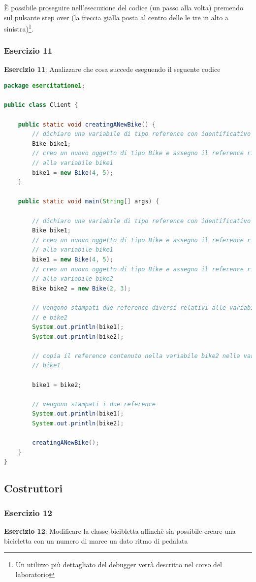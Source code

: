 \documentclass{article}
\theoremstyle{definition}
\begin{document}
\`E possibile proseguire nell'esecuzione del codice (un passo alla volta) premendo sul pulsante step over (la freccia gialla posta al centro delle le tre in alto a sinistra)\footnote{Un utilizzo pi\`u dettagliato del debugger verr\`a descritto nel corso del laboratorio}.

\subsubsection{Esercizio 11}
\begin{framed}
\textbf{Esercizio 11}: Analizzare che cosa succede eseguendo il seguente codice
\end{framed}
\begin{lstlisting}[language=Java,escapechar=|]
package esercitatione1;

public class Client {

	public static void creatingANewBike() {
		// dichiaro una variabile di tipo reference con identificativo bike1
		Bike bike1;
		// creo un nuovo oggetto di tipo Bike e assegno il reference ritornato
		// alla variabile bike1
		bike1 = new Bike(4, 5);
	}

	public static void main(String[] args) {

		// dichiaro una variabile di tipo reference con identificativo bike1
		Bike bike1;
		// creo un nuovo oggetto di tipo Bike e assegno il reference ritornato
		// alla variabile bike1
		bike1 = new Bike(4, 5);
		// creo un nuovo oggetto di tipo Bike e assegno il reference ritornato
		// alla variabile bike2
		Bike bike2 = new Bike(2, 3);

		// vengono stampati due reference diversi relativi alle variabili bike1
		// e bike2
		System.out.println(bike1);
		System.out.println(bike2);

		// copia il reference contenuto nella variabile bike2 nella variabile
		// bike1

		bike1 = bike2;

		// vengono stampati i due reference
		System.out.println(bike1);
		System.out.println(bike2);
		
		creatingANewBike();
    }
}
\end{lstlisting}


\subsection{Costruttori}
\subsubsection{Esercizio 12}
\begin{framed}
\textbf{Esercizio 12}: Modificare la classe bicibletta affinch\`e sia possibile creare una bicicletta con un numero di marce  un dato ritmo di pedalata
\end{framed}
\end{document}
